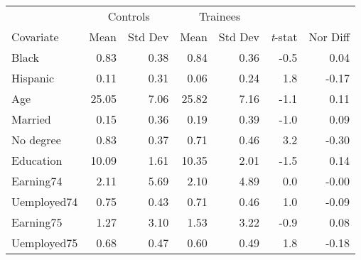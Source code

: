 \begin{tabular}{l*{6}{r}}
\hline
\hline
 & \multicolumn{2}{c}{Controls} & \multicolumn{2}{c}{Trainees} & & \\
Covariate & Mean & Std Dev & Mean & Std Dev & \textit{t}-stat & Nor Diff\\
\hline
 Black&0.83&0.38&0.84&0.36&-0.5&0.04\\
 Hispanic&0.11&0.31&0.06&0.24&1.8&-0.17\\
 Age&25.05&7.06&25.82&7.16&-1.1&0.11\\
 Married&0.15&0.36&0.19&0.39&-1.0&0.09\\
 No degree&0.83&0.37&0.71&0.46&3.2&-0.30\\
 Education&10.09&1.61&10.35&2.01&-1.5&0.14\\
 Earning74&2.11&5.69&2.10&4.89&0.0&-0.00\\
 Uemployed74&0.75&0.43&0.71&0.46&1.0&-0.09\\
 Earning75&1.27&3.10&1.53&3.22&-0.9&0.08\\
 Uemployed75&0.68&0.47&0.60&0.49&1.8&-0.18\\
\hline
\hline
\end{tabular}
